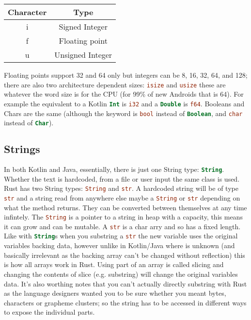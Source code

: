 \documentclass[a4paper,11pt]{article}
\begin{document}
\begin{center}
\begin{tabular}{ c|c } 

 Character & Type \\ 
 \hline
 i & Signed Integer \\ 
 f & Floating point \\ 
 u & Unsigned Integer \\ 
 
\end{tabular}
\end{center}

\renewcommand{\arraystretch}{1}
Floating points support 32 and 64 only but integers can be 8, 16, 32, 64, and 128; there are also two architecture dependent sizes: \lstinline[language=Rust]{isize} and \lstinline[language=Rust]{usize} these are whatever the word size is for the CPU (for 99\% of new Androids that is 64). For example the equivalent to a Kotlin \lstinline[language=Kotlin]{Int} is \lstinline[language=Rust]{i32} and a \lstinline[language=Kotlin]{Double} is \lstinline[language=Rust]{f64}.
\newline
Booleans and Chars are the same (although the keyword is \lstinline[language=Rust]{bool} instead of \lstinline[language=Kotlin]{Boolean}, and \lstinline[language=Rust]{char} instead of \lstinline[language=Kotlin]{Char}).

\subsection{Strings}
In both Kotlin and Java, essentially, there is just one String type: \lstinline[language=Kotlin]{String}. Whether the text is hardcoded, from a file or user input the same class is used.
Rust has two String types: \lstinline[language=Rust]{String} and \lstinline[language=Rust]{str}. A hardcoded string will be of type \lstinline[language=Rust]{str} and a string read from anywhere else maybe a \lstinline[language=Rust]{String} or \lstinline[language=Rust]{str} depending on what the method returns. They can be converted between themselves at any time infintely.
\newline
The \lstinline[language=Rust]{String} is a pointer to a string in heap with a capacity, this means it can grow and can be mutable. A \lstinline[language=Rust]{str} is a char arry and so has a fixed length.
\newline
Like with \lstinline[language=Kotlin]{String}s when you substring a \lstinline[language=Rust]{str} the new variable uses the original variables backing data, however unlike in Kotlin/Java where is unknown (and basically irrelevant as the backing array can't be changed without reflection) this is how all arrays work in Rust. Using part of an array is called slicing and changing the contents of slice (e.g. substring) will change the original variables data.
\newline
\newline
It's also worthing notes that you can't actually directly substring with Rust as the language designers wanted you to be sure whether you meant bytes, characters or grapheme clusters; so the string has to be accessed in different ways to expose the individual parts.
\end{document}
